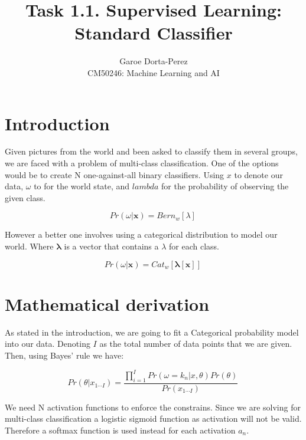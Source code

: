 \documentclass[12pt]{article}
\begin{document}
  
\title{Task 1.1. Supervised Learning: Standard Classifier}
\author{Garoe Dorta-Perez\\
CM50246: Machine Learning and AI}
 
\maketitle
 
\section{Introduction}
 
Given pictures from the world and been asked to classify them in several groups, we are faced with a problem of multi-class classification.
One of the options would be to create N one-against-all binary classifiers. Using $x$ to denote our data, $\omega$ to for the world state, and $lambda$ for the probability of observing the given class.

\begin{equation}
\label{bernoulliDistribution}
Pr(\omega|\mathbf{x}) = Bern_{w}[\lambda]\,
\end{equation}

However a better one involves using a categorical distribution to model our world. Where $\bm{\lambda}$ is a vector that contains a $\lambda$ for each class.

\begin{equation}
\label{categoricalDistribution}
Pr(\omega|\mathbf{x}) = Cat_{w}[\bm{\lambda}[\mathbf{x}]]\,
\end{equation}

\section{Mathematical derivation}

As stated in the introduction, we are going to fit a Categorical probability model into our data. 
Denoting $I$ as the total number of data points that we are given.  
Then, using Bayes' rule we have:

\begin{equation}
\label{bayes}
Pr(\theta | x_{1 \cdots I}) = \frac{\prod_{i = 1}^{I} Pr(\omega = k_{n} | x, \theta) Pr(\theta)} {Pr(x_{1 \cdots I})}\,
\end{equation}

We need N activation functions to enforce the constrains.
Since we are solving for multi-class classification a logistic sigmoid function as activation will not be valid.
Therefore a softmax function is used instead for each activation $a_{n}$.
\end{document}
